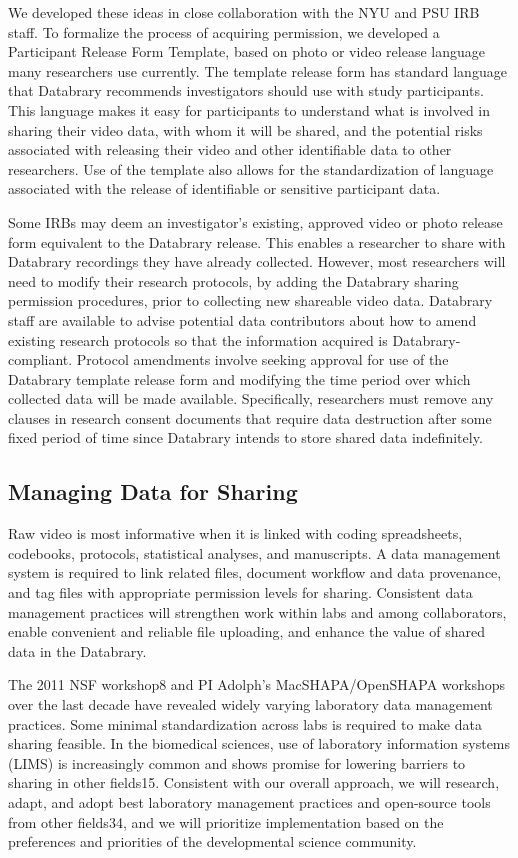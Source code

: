 \documentclass[letterpaper,man,apacite]{apa6}
\begin{document}
We developed these ideas in close collaboration with the NYU and PSU IRB staff. 
To formalize the process of acquiring permission, we developed a Participant Release Form Template, based on photo or video release language many researchers use currently. 
The template release form has standard language that Databrary recommends investigators should use
with study participants. 
This language makes it easy for participants to understand what is involved in sharing their video data, with whom it will be shared, and the potential risks associated with releasing their video and other identifiable data to other researchers. 
Use of the template also allows for the standardization of language associated with the release of identifiable or sensitive participant data.

Some IRBs may deem an investigator’s existing, approved video or photo release form equivalent to the Databrary release. 
This enables a researcher to share with Databrary recordings they have already
collected. 
However, most researchers will need to modify their research protocols, by adding the Databrary sharing permission procedures, prior to collecting new shareable video data. 
Databrary staff are available to advise potential data contributors about how to amend existing research
protocols so that the information acquired is Databrary-compliant.
Protocol amendments involve seeking approval for use of the Databrary
template release form and modifying the time period over which collected
data will be made available. 
Specifically, researchers must remove any clauses in research consent documents that require data destruction
after some fixed period of time since Databrary intends to store shared
data indefinitely.

\subsection{Managing Data for Sharing}
Raw video is most informative when it is linked with coding spreadsheets, codebooks, protocols, statistical analyses, and manuscripts. 
A data management system is required to link related files, document workflow and data provenance, and tag files with appropriate permission levels for sharing. 
Consistent data management practices will strengthen work within labs and among collaborators, enable convenient and reliable file uploading, and enhance the value of shared data in the Databrary.

The 2011 NSF workshop8 and PI Adolph's MacSHAPA/OpenSHAPA workshops over the last decade have revealed widely varying laboratory data management practices. Some minimal standardization across labs is required to make data sharing feasible. 
In the biomedical sciences, use of laboratory information systems (LIMS) is increasingly common and shows promise for lowering barriers to sharing in other fields15. 
Consistent with our overall approach, we will research, adapt, and adopt best laboratory management practices and open-source tools from other fields34, and we will prioritize implementation based on the preferences and priorities of the developmental science community.
\end{document}
